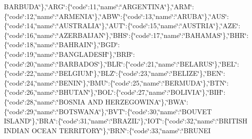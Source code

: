 {B\-A\-R\-B\-U\-D\-A\char`\"{}\},\char`\"{}A\-R\-G\char`\"{}\-:\{\char`\"{}code\char`\"{}\-:11,\char`\"{}name\char`\"{}\-:\char`\"{}A\-R\-G\-E\-N\-T\-I\-N\-A\char`\"{}\},\char`\"{}A\-R\-M\char`\"{}\-:\{\char`\"{}code\char`\"{}\-:12,\char`\"{}name\char`\"{}\-:\char`\"{}A\-R\-M\-E\-N\-I\-A\char`\"{}\},\char`\"{}A\-B\-W\char`\"{}\-:\{\char`\"{}code\char`\"{}\-:13,\char`\"{}name\char`\"{}\-:\char`\"{}A\-R\-U\-B\-A\char`\"{}\},\char`\"{}A\-U\-S\char`\"{}\-:\{\char`\"{}code\char`\"{}\-:14,\char`\"{}name\char`\"{}\-:\char`\"{}A\-U\-S\-T\-R\-A\-L\-I\-A\char`\"{}\},\char`\"{}A\-U\-T\char`\"{}\-:\{\char`\"{}code\char`\"{}\-:15,\char`\"{}name\char`\"{}\-:\char`\"{}A\-U\-S\-T\-R\-I\-A\char`\"{}\},\char`\"{}A\-Z\-E\char`\"{}\-:\{\char`\"{}code\char`\"{}\-:16,\char`\"{}name\char`\"{}\-:\char`\"{}A\-Z\-E\-R\-B\-A\-I\-J\-A\-N\char`\"{}\},\char`\"{}B\-H\-S\char`\"{}\-:\{\char`\"{}code\char`\"{}\-:17,\char`\"{}name\char`\"{}\-:\char`\"{}B\-A\-H\-A\-M\-A\-S\char`\"{}\},\char`\"{}B\-H\-R\char`\"{}\-:\{\char`\"{}code\char`\"{}\-:18,\char`\"{}name\char`\"{}\-:\char`\"{}B\-A\-H\-R\-A\-I\-N\char`\"{}\},\char`\"{}B\-G\-D\char`\"{}\-:\{\char`\"{}code\char`\"{}\-:19,\char`\"{}name\char`\"{}\-:\char`\"{}B\-A\-N\-G\-L\-A\-D\-E\-S\-H\char`\"{}\},\char`\"{}B\-R\-B\char`\"{}\-:\{\char`\"{}code\char`\"{}\-:20,\char`\"{}name\char`\"{}\-:\char`\"{}B\-A\-R\-B\-A\-D\-O\-S\char`\"{}\},\char`\"{}B\-L\-R\char`\"{}\-:\{\char`\"{}code\char`\"{}\-:21,\char`\"{}name\char`\"{}\-:\char`\"{}B\-E\-L\-A\-R\-U\-S\char`\"{}\},\char`\"{}B\-E\-L\char`\"{}\-:\{\char`\"{}code\char`\"{}\-:22,\char`\"{}name\char`\"{}\-:\char`\"{}B\-E\-L\-G\-I\-U\-M\char`\"{}\},\char`\"{}B\-L\-Z\char`\"{}\-:\{\char`\"{}code\char`\"{}\-:23,\char`\"{}name\char`\"{}\-:\char`\"{}B\-E\-L\-I\-Z\-E\char`\"{}\},\char`\"{}B\-E\-N\char`\"{}\-:\{\char`\"{}code\char`\"{}\-:24,\char`\"{}name\char`\"{}\-:\char`\"{}B\-E\-N\-I\-N\char`\"{}\},\char`\"{}B\-M\-U\char`\"{}\-:\{\char`\"{}code\char`\"{}\-:25,\char`\"{}name\char`\"{}\-:\char`\"{}B\-E\-R\-M\-U\-D\-A\char`\"{}\},\char`\"{}B\-T\-N\char`\"{}\-:\{\char`\"{}code\char`\"{}\-:26,\char`\"{}name\char`\"{}\-:\char`\"{}B\-H\-U\-T\-A\-N\char`\"{}\},\char`\"{}B\-O\-L\char`\"{}\-:\{\char`\"{}code\char`\"{}\-:27,\char`\"{}name\char`\"{}\-:\char`\"{}B\-O\-L\-I\-V\-I\-A\char`\"{}\},\char`\"{}B\-I\-H\char`\"{}\-:\{\char`\"{}code\char`\"{}\-:28,\char`\"{}name\char`\"{}\-:\char`\"{}B\-O\-S\-N\-I\-A A\-N\-D H\-E\-R\-Z\-E\-G\-O\-W\-I\-N\-A\char`\"{}\},\char`\"{}B\-W\-A\char`\"{}\-:\{\char`\"{}code\char`\"{}\-:29,\char`\"{}name\char`\"{}\-:\char`\"{}B\-O\-T\-S\-W\-A\-N\-A\char`\"{}\},\char`\"{}B\-V\-T\char`\"{}\-:\{\char`\"{}code\char`\"{}\-:30,\char`\"{}name\char`\"{}\-:\char`\"{}B\-O\-U\-V\-E\-T I\-S\-L\-A\-N\-D\char`\"{}\},\char`\"{}B\-R\-A\char`\"{}\-:\{\char`\"{}code\char`\"{}\-:31,\char`\"{}name\char`\"{}\-:\char`\"{}B\-R\-A\-Z\-I\-L\char`\"{}\},\char`\"{}I\-O\-T\char`\"{}\-:\{\char`\"{}code\char`\"{}\-:32,\char`\"{}name\char`\"{}\-:\char`\"{}B\-R\-I\-T\-I\-S\-H I\-N\-D\-I\-A\-N O\-C\-E\-A\-N T\-E\-R\-R\-I\-T\-O\-R\-Y\char`\"{}\},\char`\"{}B\-R\-N\char`\"{}\-:\{\char`\"{}code\char`\"{}\-:33,\char`\"{}name\char`\"{}\-:\char`\"{}B\-R\-U\-N\-E\-I }
